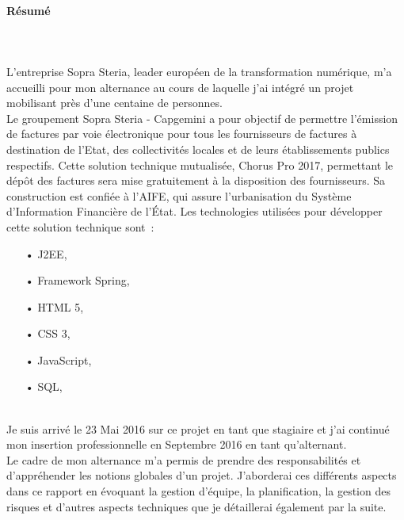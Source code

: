\documentclass[12pt,a4paper]{article}
\begin{document}
\paragraph{Résumé}
~~\\\\
\textquotesingle
L'entreprise Sopra Steria, leader européen de la transformation numérique, m'a accueilli pour mon alternance au cours de laquelle j'ai intégré un projet mobilisant près d'une centaine de personnes.\\
Le groupement Sopra Steria - Capgemini a pour objectif de permettre l’émission de factures par voie électronique pour tous les fournisseurs de factures à destination de l’Etat, des collectivités locales et de leurs établissements publics respectifs.
Cette solution technique mutualisée, Chorus Pro 2017, permettant le dépôt des factures sera mise gratuitement à la disposition des fournisseurs. Sa construction est confiée à l'\gls{AIFE}, qui assure l’urbanisation du Système d’Information Financière de l’État.
Les technologies utilisées pour développer cette solution technique sont~:\\
\begin{itemize}
\item[•] \gls{J2EE},
\item[•] Framework Spring,
\item[•] \gls{HTML} 5,
\item[•] \gls{CSS} 3,
\item[•] JavaScript,
\item[•] \gls{SQL},
\end{itemize}
~~\\
Je suis arrivé le 23 Mai 2016 sur ce projet en tant que stagiaire et j'ai continué mon insertion professionnelle en Septembre 2016 en tant qu'alternant.\\
Le cadre de mon alternance m’a permis de prendre des responsabilités et d’appréhender les notions globales d’un projet. J'aborderai ces différents aspects dans ce rapport en évoquant la gestion d’équipe, la planification, la gestion des risques et d’autres aspects techniques que je détaillerai également par la suite.\\
\newpage
\end{document}
